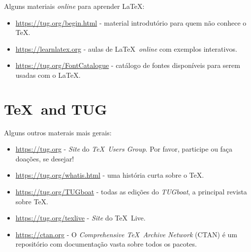 \documentclass[11pt, oneside]{article}
\begin{document}
Alguns materiais \textit{online} para aprender \LaTeX:

\begin{itemize}
\item \url{https://tug.org/begin.html} - material introdutório para quem não conhece o \TeX.

\item \url{https://learnlatex.org} - aulas de \LaTeX\ \textit{online} com exemplos interativos.

\item \url{https://tug.org/FontCatalogue} - catálogo de fontes disponíveis para serem usadas com o \LaTeX.

\end{itemize}


\section{\TeX\ and TUG}

Alguns outros materais mais gerais:

\begin{itemize}
	
\item \url{https://tug.org} - \textit{Site} do \textit{\TeX\ Users Group}. Por favor, participe ou faça doações, se desejar!

\item \url{https://tug.org/whatis.html} - uma história curta sobre o \TeX.

\item \url{https://tug.org/TUGboat} - todas as edições do \textsl{TUGboat}, a principal revista sobre \TeX.

\item \url{https://tug.org/texlive} - \textit{Site} do \TeX\ Live.

\item \url{https://ctan.org} - O \textit{Comprehensive \TeX\ Archive Network}
(CTAN) é um repositório com documentação vasta sobre todos os pacotes.

\end{itemize}
\end{document}
